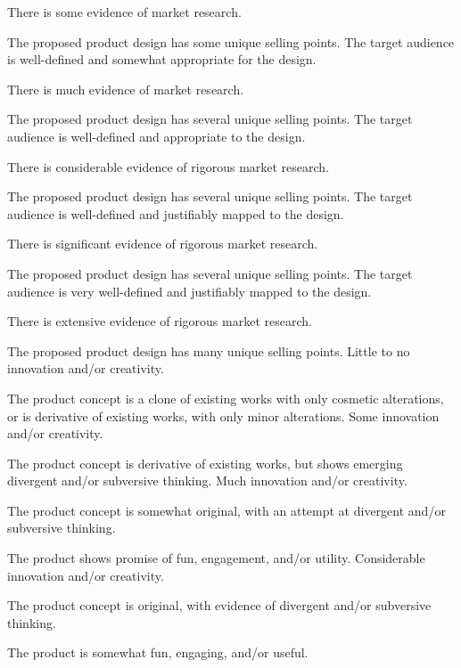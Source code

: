 \documentclass{../../fal_assignment}
\begin{document}
\begin{markingrubric}
            \par There is some evidence of market research.
            \par The proposed product design has some unique selling points.
        \grade The target audience is well-defined and somewhat appropriate for the design.
            \par There is much evidence of market research.
            \par The proposed product design has several unique selling points.
        \grade The target audience is well-defined and appropriate to the design.
            \par There is considerable evidence of rigorous market research.
            \par The proposed product design has several unique selling points.
        \grade The target audience is well-defined and justifiably mapped to the design.
            \par There is significant evidence of rigorous market research.
            \par The proposed product design has several unique selling points.
        \grade The target audience is very well-defined and justifiably mapped to the design.
            \par There is extensive evidence of rigorous market research.
            \par The proposed product design has many unique selling points.
%
        \grade\fail Little to no innovation and/or creativity.
            \par The product concept is a clone of existing works with only cosmetic alterations, or is derivative of existing works, with only minor alterations.
        \grade Some innovation and/or creativity.
            \par The product concept is derivative of existing works, but shows emerging divergent and/or subversive thinking.
        \grade Much innovation and/or creativity.
            \par The product concept is somewhat original, with an attempt at divergent and/or subversive thinking.
            \par The product shows promise of fun, engagement, and/or utility.
        \grade Considerable innovation and/or creativity.
            \par The product concept is original, with evidence of divergent and/or subversive thinking.
            \par The product is somewhat fun, engaging, and/or useful.

\end{markingrubric}
\end{document}
